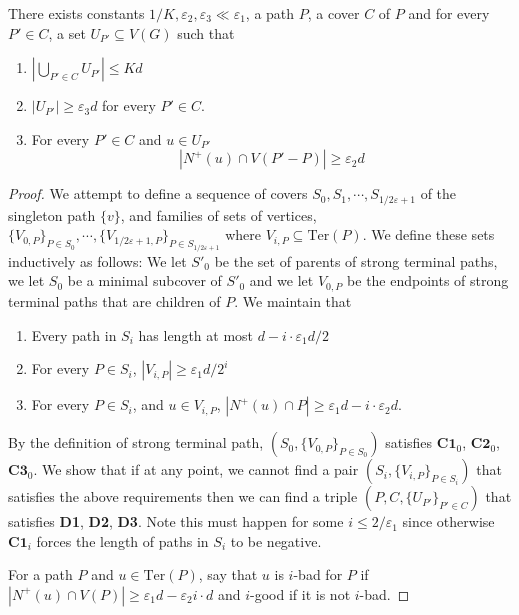 \documentclass[10pt,a4paper]{amsart}
\newcommand{\Ter}{\mathrm{Ter}}
\newcommand{\vep}{\varepsilon}
\begin{document}
\begin{lemma} \label{short_ends} There exists constants $1/K, \vep_2, \vep_3 \ll \vep_1$, a path $P$, a cover $C$ of $P$ and for every $P' \in C$, a set $U_{P'} \subseteq V(G)$ such that
\begin{enumerate}
\item[\textbf{D1}] $| \bigcup_{P' \in C} U_{P'} | \leq Kd$
\item[\textbf{D2}] $ |U_{P'} | \geq \vep_3 d$ for every $P' \in C$.
\item[\textbf{D3}] For every $P' \in C$ and $u \in U_{P'}$
\[ | N^{+} (u) \cap V(P' - P) | \geq \vep_2 d
\]
\end{enumerate}
\end{lemma}

\begin{proof} We attempt to define a sequence of covers $S_0, S_1, \cdots, S_{1/2\vep + 1}$ of the singleton path $\{v\}$, and families of sets of vertices, $ \{V_{0, P}\}_{P \in S_0}, \cdots, \{V_{1/2\vep + 1, P} \}_{P \in S_{1/2 \vep + 1}}$ where $ V_{i, P} \subseteq \Ter(P)$. We define these sets inductively as follows: We let $S'_0$ be the set of parents of strong terminal paths, we let $S_0$ be a minimal subcover of $S'_0$ and we let $V_{0, P}$ be the endpoints of strong terminal paths that are children of $P$. We maintain that
\begin{enumerate}
\item[$\textbf{C1}_i$] Every path in $S_i$ has length at most $d - i \cdot \vep_1 d /2 $
\item[$\textbf{C2}_i$] For every $P \in S_i$, $| V_{i, P} | \geq \vep_1 d/2^i$
\item[$\textbf{C3}_i$] For every $P \in S_i$, and $u \in V_{i, P}$, $|N^+(u) \cap P| \geq \vep_1 d - i \cdot \vep_2 d$.
\end{enumerate}
By the definition of strong terminal path, $(S_0, \{V_{0, P} \}_{P \in S_0})$ satisfies $\textbf{C1}_0$, $\textbf{C2}_0$, $\textbf{C3}_0$.
We show that if at any point, we cannot find a pair $(S_i, \{V_{i, P}\}_{P \in S_i})$ that satisfies the above requirements then we can find a triple $(P, C, \{U_{P'} \}_{P' \in C})$ that satisfies \textbf{D1}, \textbf{D2}, \textbf{D3}. Note this must happen for some $i \leq 2/\vep_1$ since otherwise $\textbf{C1}_i$ forces the length of paths in $S_i$ to be negative.

\medskip

For a path $P$ and $u \in \Ter(P)$, say that $u$ is $i$-bad for $P$ if $| N^+(u) \cap V(P)| \geq \vep_1 d - \vep_2 i \cdot d$ and $i$-good if it is not $i$-bad.


\end{proof}
\end{document}

